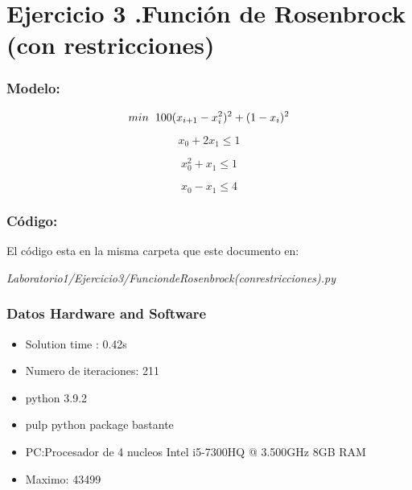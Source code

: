 \documentclass[]{article}
\begin{document}
\section*{Ejercicio 3 .Funci\'on de Rosenbrock (con restricciones)}

\subsubsection*{Modelo:}

$$ min \hspace{0.2cm} 100(x_{i+1} - x_i^2)^2 + (1 - x_i)^2 $$

$$ x_{0} + 2x_{1} \leq 1 $$

$$ x_{0}^{2} + x_{1} \leq 1 $$

$$ x_{0} - x_{1} \leq 4 $$

\subsubsection*{C\'odigo:}

El c\'odigo esta en la misma carpeta que este documento en:

\textit{ Laboratorio1/Ejercicio3/FunciondeRosenbrock(conrestricciones).py}


\subsubsection*{Datos Hardware and Software}
\begin{itemize}
	\item Solution time  :   0.42s
	\item Numero de iteraciones: 211
	\item python 3.9.2  
	\item pulp python package bastante 
	\item PC:Procesador de 4 nucleos Intel i5-7300HQ @ 3.500GHz 8GB RAM
	\item Maximo: 43499
\end{itemize}
\end{document}
